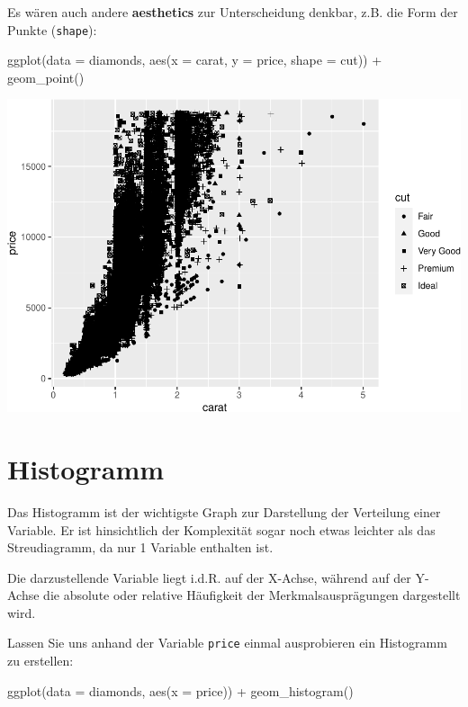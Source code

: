 \documentclass[
]{book}
\newenvironment{Shaded}{\begin{snugshade}}{\end{snugshade}}
\newcommand{\AttributeTok}[1]{\textcolor[rgb]{0.77,0.63,0.00}{#1}}
\newcommand{\FunctionTok}[1]{\textcolor[rgb]{0.00,0.00,0.00}{#1}}
\newcommand{\NormalTok}[1]{#1}
\newcommand{\SpecialCharTok}[1]{\textcolor[rgb]{0.00,0.00,0.00}{#1}}
\begin{document}
Es wären auch andere \textbf{aesthetics} zur Unterscheidung denkbar, z.B. die Form der Punkte (\texttt{shape}):

\begin{Shaded}
\begin{Highlighting}[]
\FunctionTok{ggplot}\NormalTok{(}\AttributeTok{data =}\NormalTok{ diamonds, }\FunctionTok{aes}\NormalTok{(}\AttributeTok{x =}\NormalTok{ carat, }\AttributeTok{y =}\NormalTok{ price, }\AttributeTok{shape =}\NormalTok{ cut)) }\SpecialCharTok{+}
  \FunctionTok{geom\_point}\NormalTok{()}
\end{Highlighting}
\end{Shaded}

\includegraphics{CFH_R_bookdown_files/figure-latex/unnamed-chunk-160-1.pdf}

\hypertarget{histogramm}{%
\section{Histogramm}\label{histogramm}}

Das Histogramm ist der wichtigste Graph zur Darstellung der Verteilung einer Variable. Er ist hinsichtlich der Komplexität sogar noch etwas leichter als das Streudiagramm, da nur 1 Variable enthalten ist.

Die darzustellende Variable liegt i.d.R. auf der X-Achse, während auf der Y-Achse die absolute oder relative Häufigkeit der Merkmalsausprägungen dargestellt wird.

Lassen Sie uns anhand der Variable \texttt{price} einmal ausprobieren ein Histogramm zu erstellen:

\begin{Shaded}
\begin{Highlighting}[]
\FunctionTok{ggplot}\NormalTok{(}\AttributeTok{data =}\NormalTok{ diamonds, }\FunctionTok{aes}\NormalTok{(}\AttributeTok{x =}\NormalTok{ price)) }\SpecialCharTok{+}
  \FunctionTok{geom\_histogram}\NormalTok{()}
\end{Highlighting}
\end{Shaded}
\end{document}
